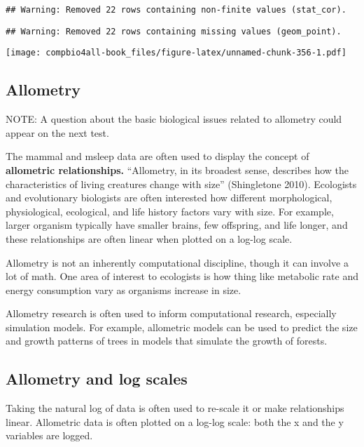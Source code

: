 \documentclass[
]{book}
\begin{document}
\begin{verbatim}
## Warning: Removed 22 rows containing non-finite values (stat_cor).
\end{verbatim}

\begin{verbatim}
## Warning: Removed 22 rows containing missing values (geom_point).
\end{verbatim}

\texttt{[image: compbio4all-book\_files/figure-latex/unnamed-chunk-356-1.pdf]}

\hypertarget{allometry}{%
\subsection{Allometry}\label{allometry}}

NOTE: A question about the basic biological issues related to allometry could appear on the next test.

The mammal and msleep data are often used to display the concept of \textbf{allometric relationships.} ``Allometry, in its broadest sense, describes how the characteristics of living creatures change with size'' (Shingletone 2010). Ecologists and evolutionary biologists are often interested how different morphological, physiological, ecological, and life history factors vary with size. For example, larger organism typically have smaller brains, few offspring, and life longer, and these relationships are often linear when plotted on a log-log scale.

Allometry is not an inherently computational discipline, though it can involve a lot of math. One area of interest to ecologists is how thing like metabolic rate and energy consumption vary as organisms increase in size.

Allometry research is often used to inform computational research, especially simulation models. For example, allometric models can be used to predict the size and growth patterns of trees in models that simulate the growth of forests.

\hypertarget{allometry-and-log-scales}{%
\subsection{Allometry and log scales}\label{allometry-and-log-scales}}

Taking the natural log of data is often used to re-scale it or make relationships linear. Allometric data is often plotted on a log-log scale: both the x and the y variables are logged.
\end{document}
